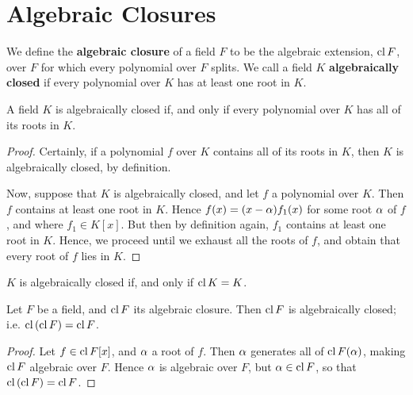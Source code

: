 \section{Algebraic Closures}
\label{section_8.5}

\begin{definition}
  We define the \textbf{algebraic closure} of a field $F$ to be the algebraic
  extension, $\operatorname{cl}{F}$, over $F$ for which every polynomial over  $F$ splits.
  We call a field  $K$  \textbf{algebraically closed} if every polynomial over
  $K$ has at least one root in  $K$.
\end{definition}

\begin{lemma}\label{lemma_8.5.1}
  A field $K$ is algebraically closed if, and only if every polynomial over
  $K$ has all of its roots in  $K$.
\end{lemma}
\begin{proof}
  Certainly, if a polynomial $f$ over  $K$ contains all of its roots in  $K$,
  then  $K$ is algebraically closed, by definition.

  Now, suppose that  $K$ is algebraically closed, and let  $f$ a polynomial
  over  $K$. Then  $f$ contains at least one root in $K$. Hence
  $f(x)=(x-\alpha)f_1(x)$ for some root $\alpha$ of $f$, and where $f_1 \in K[x]$. But
  then by definition again, $f_1$ contains at least one root in $K$. Hence,
  we proceed until we exhaust all the roots of  $f$, and obtain that every
  root of  $f$ lies in  $K$.
\end{proof}
\begin{corollary}
  $K$ is algebraically closed if, and only if  $\operatorname{cl}{K}=K$.
\end{corollary}

\begin{lemma}\label{lemma_8.5.2}
  Let $F$ be a field, and  $\operatorname{cl}{F}$ its algebraic closure. Then $\operatorname{cl}{F}$ is
  algebraically closed; i.e. $\operatorname{cl}{(\operatorname{cl}{F})}=\operatorname{cl}{F}$.
\end{lemma}
\begin{proof}
  Let $f \in \operatorname{cl}{F}[x]$, and $\alpha$ a root of  $f$. Then  $\alpha$ generates all of
  $\operatorname{cl}{F}(\alpha)$, making $\operatorname{cl}{F}$ algebraic over $F$. Hence  $\alpha$ is algebraic
  over  $F$, but  $\alpha \in \operatorname{cl}{F}$, so that $\operatorname{cl}{(\operatorname{cl}{F})}=\operatorname{cl}{F}$.
\end{proof}


